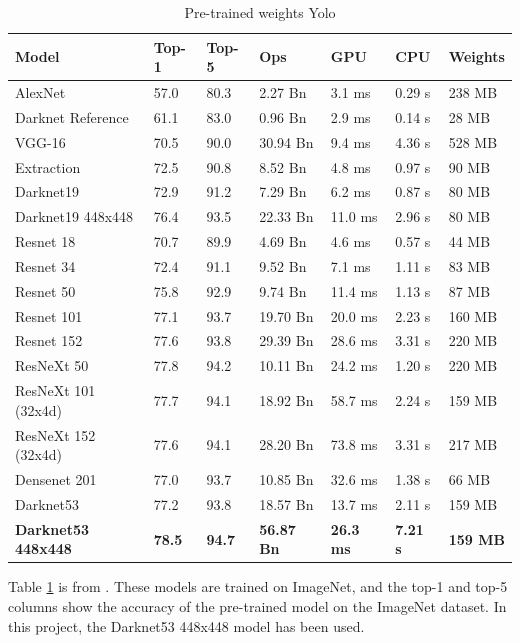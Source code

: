 \begin{table}[h!]
\begin{tabular}{lllllll}
Model               & Top-1 & Top-5 & Ops      & GPU     & CPU    & Weights \\ \hline
AlexNet             & 57.0  & 80.3  & 2.27 Bn  & 3.1 ms  & 0.29 s & 238 MB  \\
Darknet Reference   & 61.1  & 83.0  & 0.96 Bn  & 2.9 ms  & 0.14 s & 28 MB   \\
VGG-16              & 70.5  & 90.0  & 30.94 Bn & 9.4 ms  & 4.36 s & 528 MB  \\
Extraction          & 72.5  & 90.8  & 8.52 Bn  & 4.8 ms  & 0.97 s & 90 MB   \\
Darknet19           & 72.9  & 91.2  & 7.29 Bn  & 6.2 ms  & 0.87 s & 80 MB   \\
Darknet19 448x448   & 76.4  & 93.5  & 22.33 Bn & 11.0 ms & 2.96 s & 80 MB   \\
Resnet 18           & 70.7  & 89.9  & 4.69 Bn  & 4.6 ms  & 0.57 s & 44 MB   \\
Resnet 34           & 72.4  & 91.1  & 9.52 Bn  & 7.1 ms  & 1.11 s & 83 MB   \\
Resnet 50           & 75.8  & 92.9  & 9.74 Bn  & 11.4 ms & 1.13 s & 87 MB   \\
Resnet 101          & 77.1  & 93.7  & 19.70 Bn & 20.0 ms & 2.23 s & 160 MB  \\
Resnet 152          & 77.6  & 93.8  & 29.39 Bn & 28.6 ms & 3.31 s & 220 MB  \\
ResNeXt 50          & 77.8  & 94.2  & 10.11 Bn & 24.2 ms & 1.20 s & 220 MB  \\
ResNeXt 101 (32x4d) & 77.7  & 94.1  & 18.92 Bn & 58.7 ms & 2.24 s & 159 MB  \\
ResNeXt 152 (32x4d) & 77.6  & 94.1  & 28.20 Bn & 73.8 ms & 3.31 s & 217 MB  \\
Densenet 201        & 77.0  & 93.7  & 10.85 Bn & 32.6 ms & 1.38 s & 66 MB   \\
Darknet53           & 77.2  & 93.8  & 18.57 Bn & 13.7 ms & 2.11 s & 159 MB  \\
\textbf{Darknet53 448x448}   & \textbf{78.5}  & \textbf{94.7}  & \textbf{56.87 Bn} & \textbf{26.3 ms} & \textbf{7.21 s} & \textbf{159 MB} 
\end{tabular}
\caption{Pre-trained weights Yolo}
\label{yolo_tab}
\end{table}

Table \ref{yolo_tab} is from \cite{YOLOv3}. These models are trained on ImageNet, and the top-1 and top-5 columns show the accuracy of the pre-trained model on the ImageNet dataset. In this project, the Darknet53 448x448 model has been used. 



